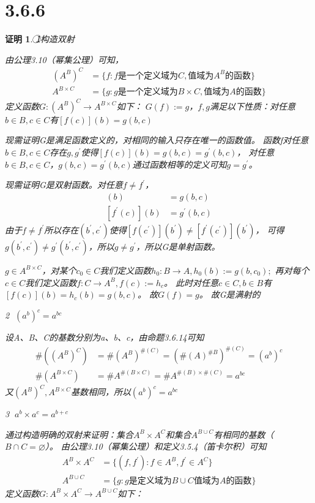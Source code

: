 \documentclass{article}
\theoremstyle{mystyle}
\theoremstyle{zproofstyle}
\newtheorem*{zproof}{证明}
\begin{document}
\section*{3.6.6}
\begin{zproof}
  \textcircled{1}构造双射

  由公理3.10（幂集公理）可知，
  \begin{align}
    (A^B)^C        & = \{f: f\text{是一个定义域为}C,\text{值域为}A^B\text{的函数}\}        \\
    A^{B \times C} & = \{g: g\text{是一个定义域为}B \times C,\text{值域为}A\text{的函数}\}
  \end{align}
  定义函数$G: (A^B)^C \rightarrow A^{B \times C}$如下：
  $G(f):=g$，$f,g$满足以下性质：对任意$b \in B, c \in C$有$[f(c)](b)=g(b,c)$

  现需证明G是满足函数定义的，对相同的输入只存在唯一的函数值。
  函数f对任意$b \in B, c \in C$存在$g, g^\prime$使得$[f(c)](b)=g(b,c)=g^\prime(b,c)$，
  对任意$b \in B, c \in C$，$g(b,c)=g^\prime(b,c)$通过函数相等的定义可知$g=g^\prime$。

  现需证明G是双射函数。对任意$f \neq f^\prime$，
  \begin{align}
    [f(c)](b)        & = g(b,c)        \\
    [f^\prime(c)](b) & = g^\prime(b,c)
  \end{align}
  由于$f \neq f^\prime$所以存在$(b^\prime, c^\prime)$使得$[f(c^\prime)](b^\prime) \neq [f^\prime(c^\prime)](b^\prime)$，
  可得$g(b^\prime, c^\prime) \neq g^\prime(b^\prime, c^\prime)$，所以$g \neq g^\prime$，所以G是单射函数。

  $g \in A^{B \times C}$，对某个$c_0\in C$我们定义函数$h_0: B\rightarrow A, h_0(b):=g(b, c_0);$
  再对每个$c\in C$我们定义函数$f: C\rightarrow A^B, f(c):=h_c$。
  此时对任意$c\in C,b\in B$有$[f(c)](b)=h_c(b)=g(b,c)$。 故$G(f)=g$。 故G是满射的

  \textcircled{2} $(a^b)^c = a^{bc}$

  设A、B、C的基数分别为a、b、c，由命题3.6.14可知
  \begin{align}
    \#((A^B)^C)        & = \#(A^B)^{\#(C)} = (\#(A)^{\#B})^{\#(C)} = (a^b)^c        \\
    \#(A^{B \times C}) & = \#A^{\#(B \times C)} = \#A^{\#(B) \times \#(C)} = a^{bc}
  \end{align}
  又$(A^B)^C,A^{B \times C}$基数相同，所以$(a^b)^c = a^{bc}$

  \textcircled{3} $a^b \times a^c = a^{b+c}$

  通过构造明确的双射来证明：集合$A^B \times A^C$和集合$A^{B \cup C}$有相同的基数（$B \cap C = \varnothing$）。
  由公理3.10（幂集公理）和定义3.5.4（笛卡尔积）可知
  \begin{align}
    A^B \times A^C & = \{(f, f^\prime): f \in A^B, f^\prime \in A^C\}        \\
    A^{B \cup C}   & = \{g: g\text{是定义域为}B \cup C \text{值域为} A \text{的函数} \}
  \end{align}
  定义函数$G: A^B \times A^C \rightarrow A^{B \cup C}$如下：


\end{zproof}
\end{document}

